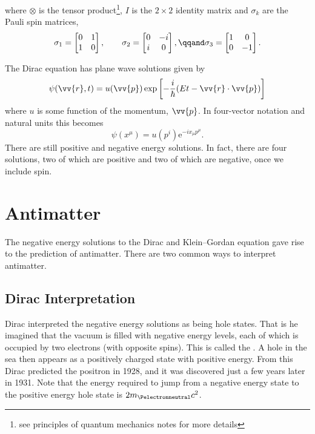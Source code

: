 \documentclass[fleqn]{NotesClass}
\newcommand*{\e}{\mathrm{e}}
\newcommand*{\ident}{I}
\begin{document}
    where \(\otimes\) is the tensor product\footnote{see principles of quantum mechanics notes for more details}, \(\ident\) is the \(2\times 2\) identity matrix and \(\sigma_k\) are the Pauli spin matrices,
    \begin{equation}
        \sigma_1 =
        \begin{bmatrix}
            0 & 1\\
            1 & 0
        \end{bmatrix}
        , \qquad \sigma_2 =
        \begin{bmatrix}
            0 & -i\\
            i & 0
        \end{bmatrix}
        , \qqand \sigma_3 =
        \begin{bmatrix}
            1 & 0\\
            0 & -1
        \end{bmatrix}
        .
    \end{equation}
    
    The Dirac equation has plane wave solutions given by
    \begin{equation}
        \psi(\vv{r}, t) = u(\vv{p}) \exp\left[ -\frac{i}{\hbar} (Et - \vv{r} \cdot \vv{p}) \right]
    \end{equation}
    where \(u\) is some function of the momentum, \(\vv{p}\).
    In four-vector notation and natural units this becomes
    \begin{equation}
        \psi(x^\mu) = u(p^i) \e^{-ix_\mu p^\mu}.
    \end{equation}
    There are still positive and negative energy solutions.
    In fact, there are four solutions, two of which are positive and two of which are negative, once we include spin.
    
    \section{Antimatter}
    The negative energy solutions to the Dirac and Klein--Gordan equation gave rise to the prediction of antimatter.
    There are two common ways to interpret antimatter.
    
    \subsection{Dirac Interpretation}
    Dirac interpreted the negative energy solutions as being hole states.
    That is he imagined that the vacuum is filled with negative energy levels, each of which is occupied by two electrons (with opposite spins).
    This is called the .
    A hole in the sea then appears as a positively charged state with positive energy.
    From this Dirac predicted the positron in 1928, and it was discovered just a few years later in 1931.
    Note that the energy required to jump from a negative energy state to the positive energy hole state is \(2m_{\Pelectronneutral}c^2\).
    
\end{document}
